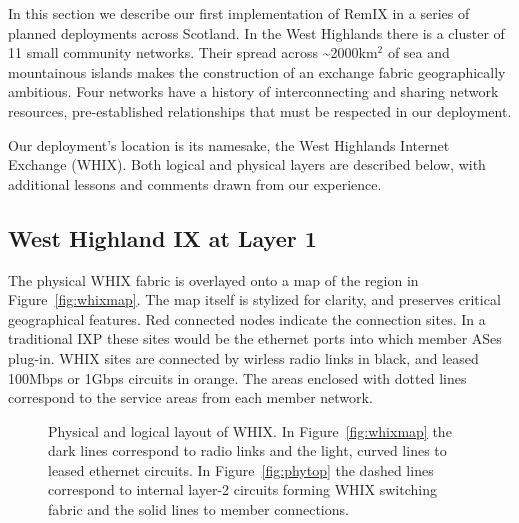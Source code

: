 
In this section we describe our first implementation of RemIX in a series of planned deployments across Scotland. In the West Highlands there
is a cluster of
11 small community networks. Their spread across \textasciitilde 2000km$^2$
of sea and mountainous islands makes the
construction of an exchange fabric geographically ambitious. Four networks have
a history of interconnecting and sharing network resources, pre-established
relationships that must be respected in our deployment.

Our deployment's location is its namesake, the West Highlands Internet
Exchange (WHIX). Both logical and physical layers are described below, with
additional lessons and comments drawn from our experience.

\subsection{West Highland IX at Layer 1}

The physical \ac{WHIX} fabric is overlayed onto a map of the region in
Figure~\ref{fig:whixmap}. The map itself is stylized for clarity, and
preserves critical geographical features. Red connected nodes indicate
the connection sites. In a traditional IXP these sites would be the
ethernet ports into which member ASes plug-in. WHIX sites are
connected by wirless radio links in black, and leased 100Mbps or 1Gbps
circuits in orange. The areas enclosed with dotted lines correspond to
the service areas from each member network.
\begin{figure*}
  \centering
  \hspace{\columnsep}
  \caption{Physical and logical layout of \ac{WHIX}. In
  Figure~\ref{fig:whixmap} the dark lines correspond to radio links
  and the light, curved lines to leased ethernet circuits.
  In Figure~\ref{fig:phytop} the dashed lines
  correspond to internal layer-2 circuits forming \ac{WHIX}
  switching fabric and the solid lines to member connections.}
\end{figure*}

